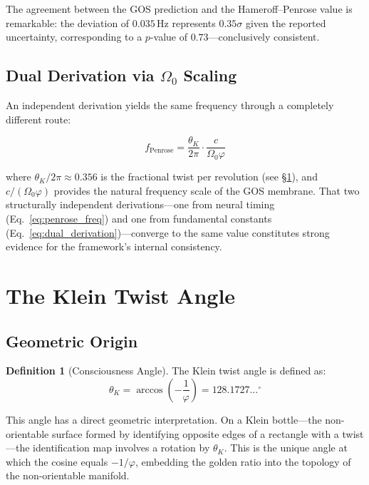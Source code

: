 \documentclass[12pt,a4paper]{article}
\theoremstyle{plain}
\theoremstyle{definition}
\newtheorem{definition}[theorem]{Definition}
\newcommand{\OmegaZero}{\Omega_0}
\newcommand{\thetaK}{\theta_K}
\newcommand{\golden}{\varphi}
\newcommand{\Hz}{\,\mathrm{Hz}}
\begin{document}
The agreement between the GOS prediction and the Hameroff--Penrose value is remarkable: the deviation of $0.035\Hz$ represents $0.35\sigma$ given the reported uncertainty, corresponding to a $p$-value of $0.73$---conclusively consistent.

\subsection{Dual Derivation via $\OmegaZero$ Scaling}

An independent derivation yields the same frequency through a completely different route:

\begin{equation}
\label{eq:dual_derivation}
f_{\mathrm{Penrose}} = \frac{\thetaK}{2\pi} \cdot \frac{c}{\OmegaZero \golden}
\end{equation}

\noindent where $\thetaK / 2\pi \approx 0.356$ is the fractional twist per revolution (see \S\ref{sec:klein}), and $c/(\OmegaZero\golden)$ provides the natural frequency scale of the GOS membrane. That two structurally independent derivations---one from neural timing (Eq.~\ref{eq:penrose_freq}) and one from fundamental constants (Eq.~\ref{eq:dual_derivation})---converge to the same value constitutes strong evidence for the framework's internal consistency.

\section{The Klein Twist Angle}
\label{sec:klein}

\subsection{Geometric Origin}

\begin{definition}[Consciousness Angle]
\label{def:theta}
The Klein twist angle is defined as:
\begin{equation}
\label{eq:theta}
\boxed{\thetaK = \arccos\!\left(-\frac{1}{\golden}\right) = 128.1727\ldots^\circ}
\end{equation}
\end{definition}

This angle has a direct geometric interpretation. On a Klein bottle---the non-orientable surface formed by identifying opposite edges of a rectangle with a twist---the identification map involves a rotation by $\thetaK$. This is the unique angle at which the cosine equals $-1/\golden$, embedding the golden ratio into the topology of the non-orientable manifold.
\end{document}
